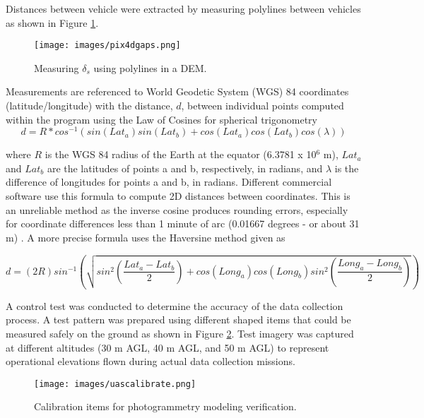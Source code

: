 Distances between vehicle were extracted by measuring polylines between vehicles as shown in Figure \ref{fig:pix4Dgaps}.
%
\begin{figure}[H]
\centering
\texttt{[image: images/pix4dgaps.png]} 
\caption{Measuring $\delta_{s}$ using polylines in a DEM.}
\label{fig:pix4Dgaps}
\end{figure}
%
Measurements are referenced to World Geodetic System (WGS) 84 coordinates (latitude/longitude) with the distance, $d$, between individual points computed within the program using the Law of Cosines for spherical trigonometry \citep{Sinnott1984}
%
\begin{equation}
\label{eq:distTrig}
d = R * cos^{-1}(sin(Lat_{a})sin(Lat_{b}) + cos(Lat_{a})cos(Lat_{b})cos(\lambda))
\end{equation}

\noindent
where $R$ is the WGS 84 radius of the Earth at the equator (6.3781 x 10$^6$ m), $Lat_{a}$ and $Lat_{b}$ are the latitudes of points a and b, respectively, in radians, and $\lambda$ is the difference of longitudes for points a and b, in radians.  Different commercial software use this formula to compute 2D distances between coordinates. This is an unreliable method as the inverse cosine produces rounding errors, especially for coordinate differences less than 1 minute of arc (0.01667 degrees - or about 31 m) \citep{Sinnott1984}. A more precise formula uses the Haversine method given as 

\begin{equation}
\label{eq:distHaversine}
d = (2R)sin^{-1}\left (\sqrt{ sin^{2}\left ( \frac{Lat_{a}-Lat_{b}}{2} \right ) + cos(Long_{a})cos(Long_{b})sin^{2} \left ( \frac{Long_{a}-Long_{b}}{2} \right ) } \right )
\end{equation}

A control test was conducted to determine the accuracy of the data collection process. A test pattern was prepared using different shaped items that could be measured safely on the ground as shown in Figure \ref{fig:uascalibration}. Test imagery was captured at different altitudes (30 m AGL, 40 m AGL, and 50 m AGL) to represent operational elevations flown during actual data collection missions. 

\begin{figure}[H]
\centering
\texttt{[image: images/uascalibrate.png]} 
\caption{Calibration items for photogrammetry modeling verification.}
\label{fig:uascalibration}
\end{figure}

